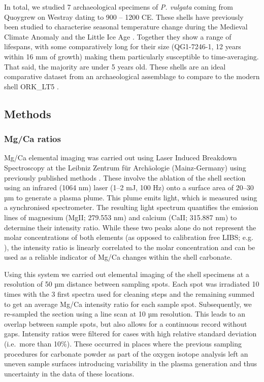 \documentclass[
  authoryear,
  preprint,
  3p]{elsarticle}
\begin{document}
In total, we studied 7 archaeological specimens of \emph{P. vulgata}
coming from Quoygrew on Westray dating to 900 -- 1200 CE. These shells
have previously been studied to characterise seasonal temperature change
during the Medieval Climate Anomaly and the Little Ice Age
\citep{Surge2012-ba}. Together they show a range of lifespans, with some
comparatively long for their size (QG1-7246-1, 12 years within 16 mm of
growth) making them particularly susceptible to time-averaging. That
said, the majority are under 5 years old. These shells are an ideal
comparative dataset from an archaeological assemblage to compare to the
modern shell ORK\_LT5 \citep{Graniero2017-io}.

\subsection{Methods}\label{methods}

\subsubsection{Mg/Ca ratios}\label{mgca-ratios}

Mg/Ca elemental imaging was carried out using Laser Induced Breakdown
Spectroscopy at the Leibniz Zentrum für Archäologie (Mainz-Germany)
using previously published methods \citep{Hausmann2023-ih}. These
involve the ablation of the shell section using an infrared (1064 nm)
laser (1--2 mJ, 100 Hz) onto a surface area of 20--30 µm to generate a
plasma plume. This plume emits light, which is measured using a
synchronised spectrometer. The resulting light spectrum quantifies the
emission lines of magnesium (MgII; 279.553 nm) and calcium (CaII;
315.887 nm) to determine their intensity ratio. While these two peaks
alone do not represent the molar concentrations of both elements (as
opposed to calibration free LIBS; e.g.
\citep{Martinez-Minchero2022-jz}), the intensity ratio is linearly
correlated to the molar concentration \citep{Hausmann2017-oa} and can be
used as a reliable indicator of Mg/Ca changes within the shell
carbonate.

Using this system we carried out elemental imaging of the shell
specimens at a resolution of 50 µm distance between sampling spots. Each
spot was irradiated 10 times with the 3 first spectra used for cleaning
steps and the remaining summed to get an average Mg/Ca intensity ratio
for each sample spot. Subsequently, we re-sampled the section using a
line scan at 10 µm resolution. This leads to an overlap between sample
spots, but also allows for a continuous record without gaps. Intensity
ratios were filtered for cases with high relative standard deviation
(i.e.~more than 10\%). These occurred in places where the previous
sampling procedures for carbonate powder as part of the oxygen isotope
analysis left an uneven sample surfaces introducing variability in the
plasma generation and thus uncertainty in the data of these locations.
\end{document}
